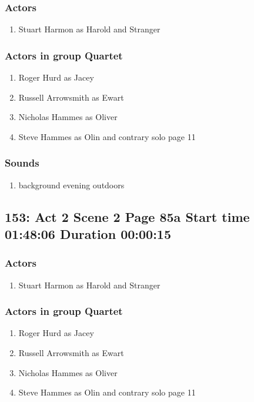 \subsubsection{Actors}
\begin{enumerate}
\item Stuart Harmon as Harold and Stranger
\end{enumerate}
\subsubsection{Actors in group Quartet}
\begin{enumerate}
\item Roger Hurd as Jacey
\item Russell Arrowsmith as Ewart
\item Nicholas Hammes as Oliver
\item Steve Hammes as Olin and contrary solo page 11
\end{enumerate}

\subsubsection{Sounds}
\begin{enumerate}
\item background evening outdoors
\end{enumerate}
\subsection{153: Act 2 Scene 2 Page 85a Start time 01:48:06 Duration 00:00:15}

\subsubsection{Actors}
\begin{enumerate}
\item Stuart Harmon as Harold and Stranger
\end{enumerate}
\subsubsection{Actors in group Quartet}
\begin{enumerate}
\item Roger Hurd as Jacey
\item Russell Arrowsmith as Ewart
\item Nicholas Hammes as Oliver
\item Steve Hammes as Olin and contrary solo page 11
\end{enumerate}

